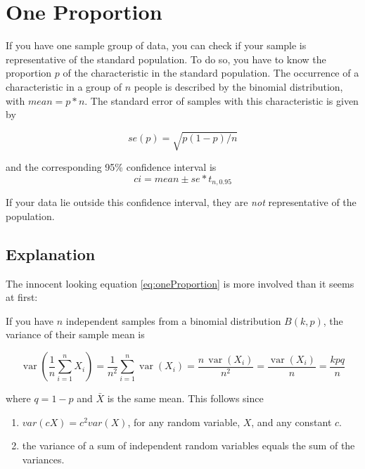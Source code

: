 \section{One Proportion}

If you have one sample group of data, you can check if your sample is representative of the standard population. To do so, you have to know the proportion $p$ of the characteristic in the standard population. The occurrence of a characteristic in a group of $n$ people is described by the binomial distribution, with $mean = p*n$. The standard error of samples with this characteristic is given by

\begin{equation}\label{eq:oneProportion}
  se(p) = \sqrt{p(1-p)/n}
\end{equation}

and the corresponding 95\% confidence interval is
\begin{equation*}
  ci = mean \pm se * t_{n,0.95}
\end{equation*}

If your data lie outside this confidence interval, they are \emph{not} representative of the population.

\subsection{Explanation}

The innocent looking equation \ref{eq:oneProportion} is more involved than it seems at first:

If you have $n$ independent samples from a binomial distribution $B(k,p)$, the variance of their sample mean is

\begin{equation*}
    \operatorname{var} \left( {\frac{1}{n}\sum\limits_{i = 1}^n {{X_i}} } \right) = \frac{1}{{{n^2}}}\sum\limits_{i = 1}^n {\operatorname{var} ({X_i})}  = \frac{{n\,\operatorname{var} ({X_i})}}{{{n^2}}} = \frac{{\operatorname{var} ({X_i})}}{n} = \frac{{kpq}}{n}
\end{equation*}

where $q=1−p$ and $\bar{X}$ is the same mean. This follows since
\begin{enumerate}
  \item $var(cX)=c^2 var(X)$, for any random variable, $X$, and any constant $c$.
  \item the variance of a sum of independent random variables equals the sum of the variances.
\end{enumerate}

